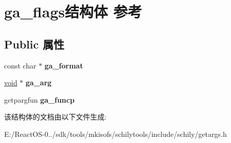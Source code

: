 \hypertarget{structga__flags}{}\section{ga\+\_\+flags结构体 参考}
\label{structga__flags}
\subsection*{Public 属性}
\begin{DoxyCompactItemize}
\item 
\mbox{\label{structga__flags_adbd5b644c71e6ed667c65df8e3696e6d}} 
const char $\ast$ {\bfseries ga\+\_\+format}
\item 
\mbox{\label{structga__flags_a4f07d052dad34d3ab4258b29910b03ae}} 
\hyperlink{interfacevoid}{void} $\ast$ {\bfseries ga\+\_\+arg}
\item 
\mbox{\label{structga__flags_a6a0e9c41cc9d6bb98956329b28078431}} 
getpargfun {\bfseries ga\+\_\+funcp}
\end{DoxyCompactItemize}


该结构体的文档由以下文件生成\+:\begin{DoxyCompactItemize}
\item 
E\+:/\+React\+O\+S-\/0../sdk/tools/mkisofs/schilytools/include/schily/getargs.\+h\end{DoxyCompactItemize}
